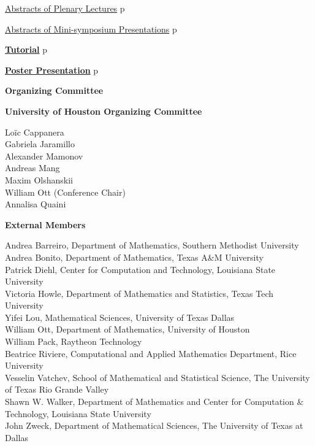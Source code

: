 \noindent\quad\hyperref[plenary]{{\large  Abstracts of Plenary Lectures}}%
\dotfill{}p\pageref{plenary}
\vspace{1ex}

\noindent\quad\hyperref[absmini]{{\large  Abstracts of Mini-symposium Presentations}}%
\dotfill{}p\pageref{absmini}
\vspace{3ex}

\noindent\hyperref[tutorial]{{\bfseries\large  Tutorial}}%
\dotfill{}p\pageref{tutorial}
\vspace{3ex}

\noindent\hyperref[poster]{{\bfseries\large  Poster Presentation}}
\dotfill{}p\pageref{poster}

\newpage\newpage
\thispagestyle{empty}
\newpage
\clearpage


\thispagestyle{empty}
\label{committee}
\centerline{\bfseries\Large Organizing Committee}
\vspace{10ex}

\noindent
{\bfseries\large  University of Houston Organizing Committee}
\vspace{1ex}

\noindent
Loïc Cappanera\\
Gabriela Jaramillo\\
Alexander Mamonov\\
Andreas Mang\\
Maxim Olshanskii\\
William Ott (Conference Chair)\\
Annalisa Quaini

\vspace{4ex}

\noindent
{\bfseries\large  External Members}

\vspace{1ex}

\noindent
Andrea Barreiro, Department of Mathematics, Southern Methodist University\\
Andrea Bonito, Department of Mathematics, Texas A\&M University\\
Patrick Diehl, Center for Computation and Technology, Louisiana State University\\
Victoria Howle, Department of Mathematics and Statistics, Texas Tech University\\
Yifei Lou, Mathematical Sciences, University of Texas Dallas\\
William Ott, Department of Mathematics, University of Houston\\
William Pack, Raytheon Technology\\
Beatrice Riviere, Computational and Applied Mathematics Department, Rice University\\
Vesselin Vatchev, School of Mathematical and Statistical Science, The University of Texas Rio Grande Valley\\
Shawn W. Walker, Department of Mathematics and Center for Computation \& Technology, Louisiana State University\\
John Zweck, Department of Mathematical Sciences, The University of Texas at Dallas\\


\clearpage
